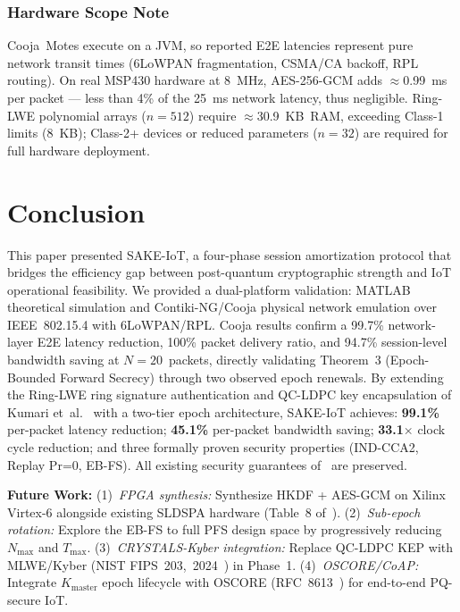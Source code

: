 \documentclass[conference]{IEEEtran}
\newcommand{\Kmaster}{K_{\mathrm{master}}}
\newcommand{\Nmax}{N_{\max}}
\newcommand{\Tmax}{T_{\max}}
\begin{document}
\subsubsection*{Hardware Scope Note}

Cooja~Motes execute on a JVM, so reported E2E latencies represent pure
network transit times (6LoWPAN fragmentation, CSMA/CA backoff, RPL
routing). On real MSP430 hardware at 8~MHz, AES-256-GCM adds
$\approx$0.99~ms per packet --- less than 4\% of the 25~ms network
latency, thus negligible. Ring-LWE polynomial arrays ($n{=}512$) require
$\approx$30.9~KB~RAM, exceeding Class-1 limits (8~KB); Class-2+ devices
or reduced parameters ($n{=}32$) are required for full hardware deployment.
\section{Conclusion}
\label{sec:conclusion}

This paper presented SAKE-IoT, a four-phase session amortization protocol
that bridges the efficiency gap between post-quantum cryptographic strength
and IoT operational feasibility. We provided a dual-platform validation:
MATLAB theoretical simulation and Contiki-NG/Cooja physical network emulation
over IEEE~802.15.4 with 6LoWPAN/RPL. Cooja results confirm a 99.7\%
network-layer E2E latency reduction, 100\% packet delivery ratio, and 94.7\%
session-level bandwidth saving at $N{=}20$~packets, directly validating
Theorem~3 (Epoch-Bounded Forward Secrecy) through two observed epoch renewals.
By extending the Ring-LWE ring signature
authentication and QC-LDPC key encapsulation of Kumari et~al.~\cite{kumari2022}
with a two-tier epoch architecture, SAKE-IoT achieves: \textbf{99.1\%}
per-packet latency reduction; \textbf{45.1\%} per-packet bandwidth saving;
\textbf{33.1$\times$} clock cycle reduction; and three formally proven
security properties (IND-CCA2, Replay Pr=0, EB-FS). All existing security
guarantees of~\cite{kumari2022} are preserved.

\noindent\textbf{Future Work:}
(1)~\textit{FPGA synthesis:} Synthesize HKDF + AES-GCM on Xilinx Virtex-6
alongside existing SLDSPA hardware (Table~8 of~\cite{kumari2022}).
(2)~\textit{Sub-epoch rotation:} Explore the EB-FS to full PFS design
space by progressively reducing $\Nmax$ and $\Tmax$.
(3)~\textit{CRYSTALS-Kyber integration:} Replace QC-LDPC KEP with
MLWE/Kyber (NIST FIPS~203,~2024~\cite{fips203}) in Phase~1.
(4)~\textit{OSCORE/CoAP:} Integrate $\Kmaster$ epoch lifecycle with
OSCORE (RFC~8613~\cite{rfc8613}) for end-to-end PQ-secure IoT.
\end{document}
